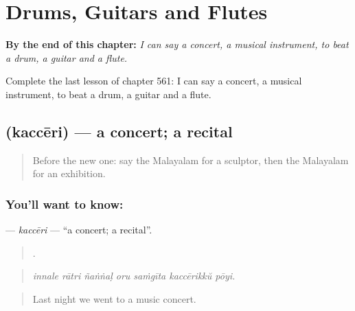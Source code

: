 
\chapter{Drums, Guitars and Flutes}
\label{ch:ml-drums-guitars-and-flutes}

\begin{chapteropening}
\textbf{By the end of this chapter:} \emph{I can say a concert, a musical instrument, to beat a drum, a guitar and a flute.}

Complete the last lesson of chapter 561: I can say a concert, a musical instrument, to beat a drum, a guitar and a flute.
\end{chapteropening}

\section[\texorpdfstring{\ml{കച്ചേരി} (kaccēri)}{കച്ചേരി (kaccēri)}]{ (kaccēri) — a concert; a recital}

\label{lesson:ML-C561-kacceri}



\begin{quote}
Before the new one: say the Malayalam for a sculptor, then the Malayalam for an exhibition.
\end{quote}

\subsection*{You'll want to know: }
\textbf{} — \emph{kaccēri} — \textquotedblleft{}a concert; a recital\textquotedblright{}.

\begin{quote}
      .
\end{quote}

\begin{quote}
\emph{innale rātri ñaṅṅaḷ oru saṁgīta kaccērikkŭ pōyi.}
\end{quote}

\begin{quote}
Last night we went to a music concert.
\end{quote}


